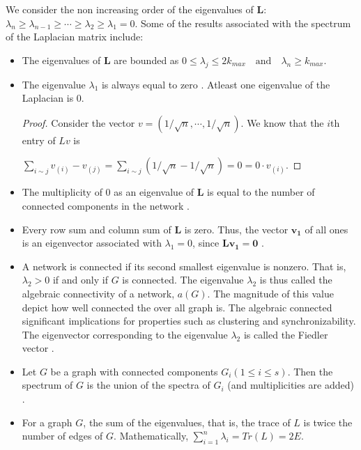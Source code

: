 \documentclass[10pt,a4paper]{article}
\begin{document}
We consider the non increasing order of the eigenvalues of $\mathbf{L}$: $\lambda_n  \geq \lambda_{n-1} \geq  \cdots \geq \lambda_2 \geq \lambda_1 =0 $. Some of the results associated with the spectrum of the Laplacian matrix include:
\begin{itemize}
	\item The eigenvalues of $\mathbf{L}$ are bounded as 
	$ 0 \leq \lambda_j \leq 2k_{max} \quad \text{and} \quad \lambda_n \geq k_{max} $.
	\item The eigenvalue $\lambda_1$ is always equal to zero \citep{estrada2011structure}. Atleast one eigenvalue of the Laplacian is $0$.
	\begin{proof}
		Consider the vector $v= (1/\sqrt{n}, \cdots, 1/\sqrt{n}) $. We know that the $i$th entry of $Lv$ is 
		
		$\sum_{i\sim j} v_{(i)}- v_{(j)} = \sum_{i\sim j} (1/\sqrt{n} - 1/\sqrt{n}) = 0 = 0 \cdot v_{(i)}$.
	\end{proof}
	\item The multiplicity of $0$ as an eigenvalue of $\mathbf{L}$ is equal to the number of connected components in the network \citep{estrada2011structure}.
	\item Every row sum and column sum of $\mathbf{L}$ is zero. Thus, the vector $\mathbf{v_1}$ of all ones is an eigenvector associated with $\lambda_1 =0$, since $\mathbf{Lv_1} = \mathbf{0} $ \citep{das2004laplacian}.
	\item  A network is connected if its second smallest eigenvalue is nonzero. That is, $\lambda_2> 0$ if and only if $G$ is connected. The eigenvalue $\lambda_2$ is thus called the algebraic connectivity of a network, $a(G)$. The magnitude of this value depict how well connected  the over all graph is. The algebraic connected significant implications for properties such as clustering and synchronizability.
	The eigenvector corresponding to the eigenvalue $\lambda_2$ is called the Fiedler vector \citep{estrada2015first}.
	
	\item Let $G$ be a graph with connected components $G_i (1 \leq i \leq s)$. Then the spectrum of $G$ is the union of the spectra of $G_i$ (and multiplicities are added) \citep{brouwer2011spectra}.
	
	\item For a graph $G$, the sum of the eigenvalues, that is, the trace of $L$ is twice the number of edges of $G$. Mathematically, $\sum_{i=1}^n \lambda_i = Tr(L) = 2E.$\\
	
\end{itemize}
\end{document}
